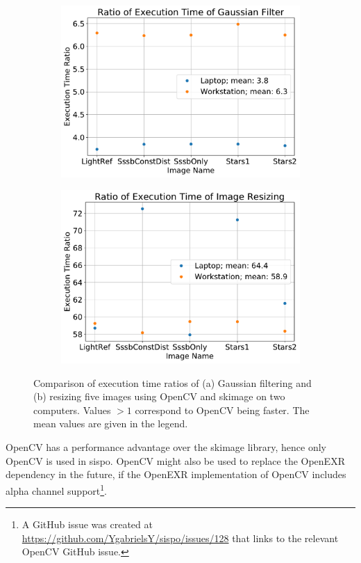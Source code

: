 
\begin{figure}[htb]
    \centering
    \begin{subfigure}[b]{0.47\textwidth}
        \centering
        \includegraphics[width=\textwidth]{doc/thesis/0_figures/cv_skimage/Comparison_Gaussian}
        \caption{}
        \label{fig:bm_comparison_gauss}
    \end{subfigure}
    \begin{subfigure}[b]{0.47\textwidth}
        \centering
        \includegraphics[width=\textwidth]{doc/thesis/0_figures/cv_skimage/Comparison_Resize}
        \caption{}
        \label{fig:bm_comparison_res}
    \end{subfigure}
    \caption{Comparison of execution time ratios of (a) Gaussian filtering and (b) resizing five images using OpenCV and \gls{skimage} on two computers. Values $> 1$ correspond to OpenCV being faster. The mean values are given in the legend.}
    \label{fig:bm_comparison}
\end{figure}

OpenCV has a performance advantage over the \gls{skimage} library, hence only OpenCV is used in \gls{sispo}. OpenCV might also be used to replace the OpenEXR dependency in the future, if the OpenEXR implementation of OpenCV includes alpha channel support\footnote{A GitHub issue was created at \url{https://github.com/YgabrielsY/sispo/issues/128} that links to the relevant OpenCV GitHub issue.}.